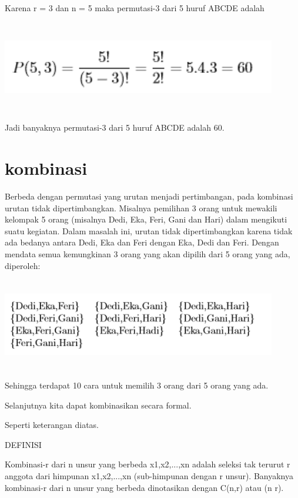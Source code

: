 \documentclass[11pt,fleqn]{book} %
\begin{document}
Karena r = 3 dan n = 5 maka permutasi-3 dari 5 huruf ABCDE adalah

\includegraphics[width = 12cm, height= 4cm]{Pictures/herlin3.png}

Jadi banyaknya permutasi-3 dari 5 huruf ABCDE adalah 60.

\section{kombinasi}


Berbeda dengan permutasi yang urutan menjadi pertimbangan, pada kombinasi urutan tidak dipertimbangkan. Misalnya pemilihan 3 orang untuk mewakili kelompak 5 orang (misalnya Dedi, Eka, Feri, Gani dan Hari) dalam mengikuti suatu kegiatan. Dalam masalah ini, urutan tidak dipertimbangkan karena tidak ada bedanya antara Dedi, Eka dan Feri dengan Eka, Dedi dan Feri. Dengan mendata semua kemungkinan 3 orang yang akan dipilih dari 5 orang yang ada, diperoleh:

\includegraphics[width = 12cm, height= 4cm]{Pictures/herlin4.png}

Sehingga terdapat 10 cara untuk memilih 3 orang dari 5 orang yang ada.

Selanjutnya kita dapat kombinasikan secara formal.

Seperti keterangan diatas.



DEFINISI


Kombinasi-r dari n unsur yang berbeda x1,x2,...,xn adalah seleksi tak terurut r anggota dari himpunan {x1,x2,...,xn} (sub-himpunan dengan r unsur). Banyaknya kombinasi-r dari n unsur yang berbeda dinotasikan dengan C(n,r) atau (n r).
\end{document}
